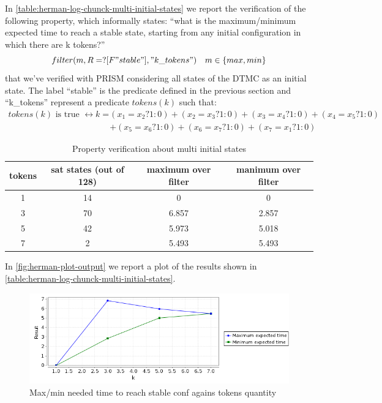 In \autoref{table:herman-log-chunck-multi-initial-states} we report
the verification of the following property, which informally states:
``what is the maximum/minimum expected time to reach a stable state,
starting from any initial configuration in which there are k tokens?''
\begin{displaymath}
  filter(m, R=? [ F "stable" ], "k\_tokens") \quad m \in \{max, min\}
\end{displaymath}
that we've verified with PRISM considering all states of the DTMC as
an initial state. The label ``stable'' is the predicate defined in the
previous section and ``k\_tokens'' represent a predicate $tokens(k)$
such that:
\begin{displaymath}
  \begin{split}
    tokens(k) \text{ is true } \leftrightarrow k = &(x_1=x_2?1:0)+(x_2=x_3?1:0)+(x_3=x_4?1:0)+(x_4=x_5?1:0)\\
    &+(x_5=x_6?1:0)+(x_6=x_7?1:0)+(x_7=x_1?1:0)
  \end{split}
\end{displaymath}

\begin{table}[ht]
  \begin{center}
    \begin{tabular}{cccc}
      \hline
      tokens & sat states (out of 128)  & maximum over filter &
      manimum over filter \\ 
      \hline     
      1 & 14 & 0 & 0 \\
      3 & 70 & 6.857 & 2.857  \\
      5 & 42 & 5.973 & 5.018  \\
      7 & 2 & 5.493 & 5.493  \\ 
      \hline
    \end{tabular}
    \caption{Property verification about multi initial states}
    \label{table:herman-log-chunck-multi-initial-states}
  \end{center}
\end{table}

In \autoref{fig:herman-plot-output} we report a plot of the results
shown in \autoref{table:herman-log-chunck-multi-initial-states}.
\begin{figure}[htb]
  \centering
  \includegraphics[width=13cm]{quantitative-project/max-min-expected-time-experiment.png}
  \caption{Max/min needed time to reach stable conf agains
    tokens quantity}
  \label{fig:herman-plot-output}
\end{figure}

